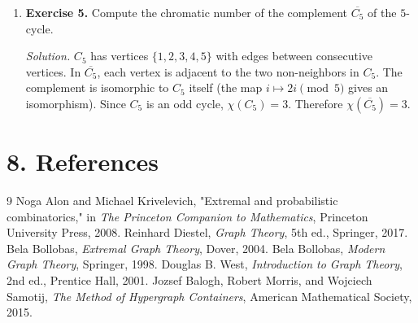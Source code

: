 \begin{enumerate}[leftmargin=*,itemsep=0.9em]
\item \textbf{Exercise 5.} Compute the chromatic number of the complement $\overline{C_5}$ of the $5$-cycle.

\emph{Solution.} $C_5$ has vertices $\{1,2,3,4,5\}$ with edges between consecutive vertices. In $\overline{C_5}$, each vertex is adjacent to the two non-neighbors in $C_5$. The complement is isomorphic to $C_5$ itself (the map $i\mapsto 2i\pmod{5}$ gives an isomorphism). Since $C_5$ is an odd cycle, $\chi(C_5)=3$. Therefore $\chi(\overline{C_5})=3$.

\end{enumerate}
\section*{8. References}

\begin{thebibliography}{9}
 Noga Alon and Michael Krivelevich, "Extremal and probabilistic combinatorics," in \emph{The Princeton Companion to Mathematics}, Princeton University Press, 2008.
 Reinhard Diestel, \emph{Graph Theory}, 5th ed., Springer, 2017.
 Bela Bollobas, \emph{Extremal Graph Theory}, Dover, 2004.
 Bela Bollobas, \emph{Modern Graph Theory}, Springer, 1998.
 Douglas B. West, \emph{Introduction to Graph Theory}, 2nd ed., Prentice Hall, 2001.
 Jozsef Balogh, Robert Morris, and Wojciech Samotij, \emph{The Method of Hypergraph Containers}, American Mathematical Society, 2015.
\end{thebibliography}
